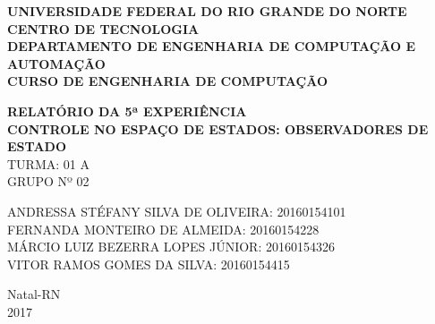 \documentclass[a4paper,12pt]{article}
\begin{document}
\onehalfspacing

\thispagestyle{empty}

\setcounter{page}{1}


\begin{figure}[!ht]

\centering

\hspace{11.09cm}

\label{Logos}

\end{figure}


\vspace{-1cm}

\begin{center}
{\bf{\normalsize UNIVERSIDADE FEDERAL DO RIO GRANDE DO NORTE\\
CENTRO DE TECNOLOGIA\\
DEPARTAMENTO DE ENGENHARIA DE COMPUTAÇÃO E AUTOMAÇÃO\\
CURSO DE ENGENHARIA DE COMPUTAÇÃO
}}


\vspace{3.6cm}

{\bf{\large RELATÓRIO DA 5ª EXPERIÊNCIA\\
CONTROLE NO ESPAÇO DE ESTADOS: OBSERVADORES DE ESTADO\\
}}
\vspace{1.5cm}
{\large TURMA: 01 A\\
	GRUPO Nº 02}


\vspace{3.6cm}


\begin{flushright}
\begin{normalsize}
ANDRESSA STÉFANY SILVA DE OLIVEIRA: 20160154101\\
\vspace{0.8cm}
FERNANDA MONTEIRO DE ALMEIDA: 20160154228\\
\vspace{0.8cm}
MÁRCIO LUIZ BEZERRA LOPES JÚNIOR: 20160154326\\
\vspace{0.8cm}
VITOR RAMOS GOMES DA SILVA: 20160154415\\
\end{normalsize}
\end{flushright}


\vspace{2.5cm}

{\large Natal-RN\\
2017}

\end{center}
\end{document}
